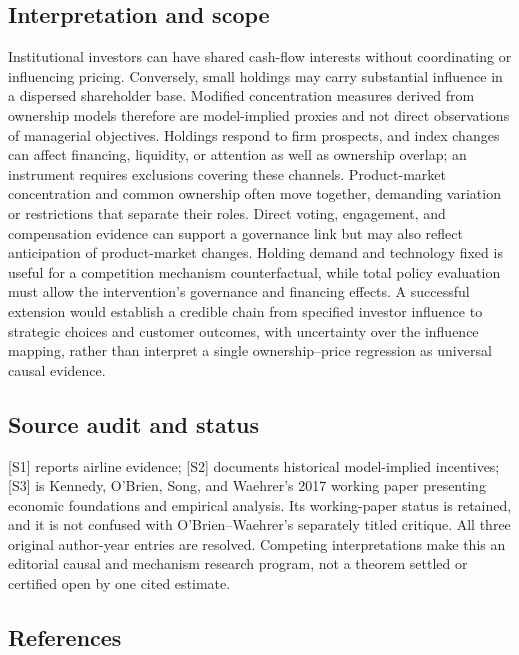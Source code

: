 \documentclass[11pt,a4paper]{article}
\begin{document}
\subsection*{Interpretation and scope}

Institutional investors can have shared cash-flow interests without coordinating or influencing pricing. Conversely, small holdings may carry substantial influence in a dispersed shareholder base. Modified concentration measures derived from ownership models therefore are model-implied proxies and not direct observations of managerial objectives. Holdings respond to firm prospects, and index changes can affect financing, liquidity, or attention as well as ownership overlap; an instrument requires exclusions covering these channels. Product-market concentration and common ownership often move together, demanding variation or restrictions that separate their roles. Direct voting, engagement, and compensation evidence can support a governance link but may also reflect anticipation of product-market changes. Holding demand and technology fixed is useful for a competition mechanism counterfactual, while total policy evaluation must allow the intervention's governance and financing effects. A successful extension would establish a credible chain from specified investor influence to strategic choices and customer outcomes, with uncertainty over the influence mapping, rather than interpret a single ownership--price regression as universal causal evidence.

\subsection*{Source audit and status}

[S1] reports airline evidence; [S2] documents historical model-implied incentives; [S3] is Kennedy, O'Brien, Song, and Waehrer's 2017 working paper presenting economic foundations and empirical analysis. Its working-paper status is retained, and it is not confused with O'Brien--Waehrer's separately titled critique. All three original author-year entries are resolved. Competing interpretations make this an editorial causal and mechanism research program, not a theorem settled or certified open by one cited estimate.

\subsection*{References}
\end{document}
